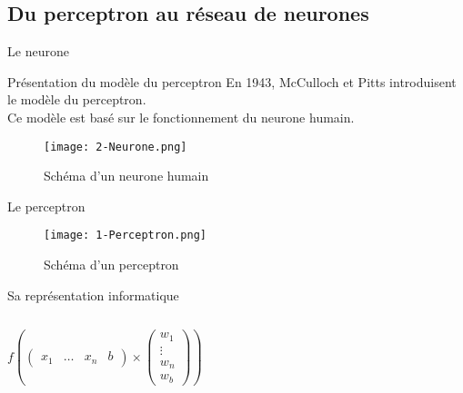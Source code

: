 \subsection{Du perceptron au réseau de neurones}

\begin{frame}{Le neurone}
	\begin{block}{Présentation du modèle du perceptron}
		En 1943, McCulloch et Pitts introduisent le modèle du perceptron.  \\
		Ce modèle est basé sur le fonctionnement du neurone humain.
	\end{block}
	\begin{figure}
		\centering
		\texttt{[image: 2-Neurone.png]}
		\caption{Schéma d'un neurone humain}
	\end{figure}
\end{frame}

\begin{frame}{Le perceptron}
	\begin{figure}
		\centering
		\texttt{[image: 1-Perceptron.png]}
		\caption{Schéma d'un perceptron}
	\end{figure}
\end{frame}


\begin{frame}{Sa représentation informatique}
	\begin{columns}
		\begin{column}[]{0.4\textwidth}
			\begin{center}
				$
					f
					\left(
					\begin{pmatrix}
						x_1 & \ldots & x_n & b
					\end{pmatrix}
					\times
					\begin{pmatrix}
						w_1    \\
						\vdots \\
						w_n    \\
						w_b
					\end{pmatrix}
					\right)
				$ \\
			\end{center}
		\end{column}
		\begin{column}[]{0.5\textwidth}
			
		\end{column}
	\end{columns}
\end{frame}


